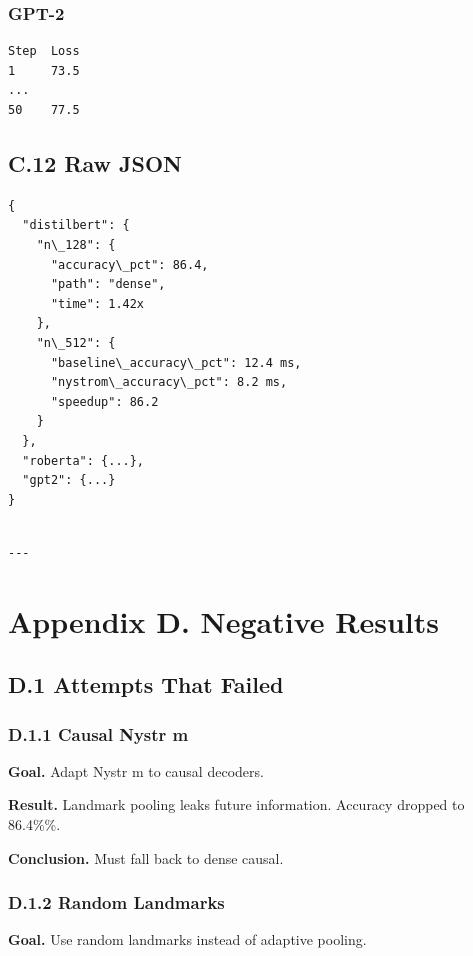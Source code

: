 \subsubsection{GPT-2}
\begin{lstlisting}
Step  Loss
1     73.5
...
50    77.5
\end{lstlisting}

\subsection{C.12 Raw JSON}

\begin{lstlisting}
{
  "distilbert": {
    "n\_128": {
      "accuracy\_pct": 86.4,
      "path": "dense",
      "time": 1.42x
    },
    "n\_512": {
      "baseline\_accuracy\_pct": 12.4 ms,
      "nystrom\_accuracy\_pct": 8.2 ms,
      "speedup": 86.2
    }
  },
  "roberta": {...},
  "gpt2": {...}
}
\end{lstlisting}
\begin{lstlisting}

---
\end{lstlisting}


\section{Appendix D. Negative Results}

\subsection{D.1 Attempts That Failed}

\subsubsection{D.1.1 Causal Nystr m}

\textbf{Goal.} Adapt Nystr m to causal decoders.

\textbf{Result.} Landmark pooling leaks future information. Accuracy dropped 
to 86.4\%\%.

\textbf{Conclusion.} Must fall back to dense causal.

\subsubsection{D.1.2 Random Landmarks}

\textbf{Goal.} Use random landmarks instead of adaptive pooling.

